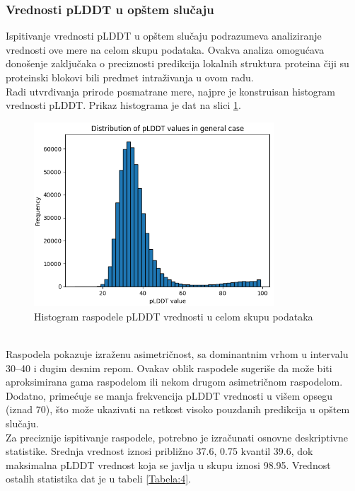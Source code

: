 \documentclass[a4paper,12pt]{article}
\begin{document}
\subsubsection{Vrednosti pLDDT u opštem slučaju}
Ispitivanje vrednosti pLDDT u opštem slučaju podrazumeva analiziranje vrednosti ove mere na celom skupu podataka. Ovakva analiza omogućava donošenje zaključaka o preciznosti predikcija lokalnih struktura proteina čiji su proteinski blokovi bili predmet intraživanja u ovom radu. \\
Radi utvrđivanja prirode posmatrane mere, najpre je konstruisan histogram vrednosti pLDDT. Prikaz histograma je dat na slici \ref{Slika:distribution}.
\begin{figure}[htbp]
    	\centering
    	\includegraphics[width=0.8\textwidth]{./images/dist_dataset.png}
    	\caption{Histogram raspodele pLDDT vrednosti u celom skupu podataka}
    	\label{Slika:distribution}
\end{figure}
\\
Raspodela pokazuje izraženu asimetričnost, sa dominantnim vrhom u intervalu 30–40 i dugim desnim repom. Ovakav oblik raspodele sugeriše da može biti aproksimirana gama raspodelom ili nekom drugom asimetričnom raspodelom. Dodatno, primećuje se manja frekvencija pLDDT vrednosti u višem opsegu (iznad 70), što može ukazivati na retkost visoko pouzdanih predikcija u opštem slučaju. \\
Za preciznije ispitivanje raspodele, potrebno je izračunati osnovne deskriptivne statistike. Srednja vrednost iznosi približno 37.6, 0.75 kvantil 39.6, dok maksimalna pLDDT vrednost koja se javlja u skupu iznosi 98.95. Vrednost ostalih statistika dat je u tabeli \ref{Tabela:4}.
\end{document}

